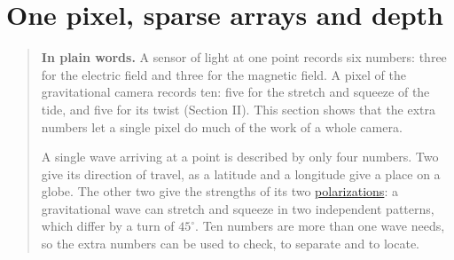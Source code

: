 \section{One pixel, sparse arrays and depth}\label{sec:one-pixel}

\begin{quote}
\textbf{In plain words.} A sensor of light at one point records six numbers:
three for the electric field and three for the magnetic field. A pixel of the
gravitational camera records ten: five for the stretch and squeeze of the
tide, and five for its twist (Section II). This section shows that the extra
numbers let a single pixel do much of the work of a whole camera.

A single wave arriving at a point is described by only four numbers. Two give
its direction of travel, as a latitude and a longitude give a place on a
globe. The other two give the strengths of its two
\href{https://en.wikipedia.org/wiki/Polarization_(waves)}{polarizations}: a
gravitational wave can stretch and squeeze in two independent patterns, which
differ by a turn of $45^\circ$. Ten numbers are more than one wave needs, so the
extra numbers can be used to check, to separate and to locate.


\end{quote}
